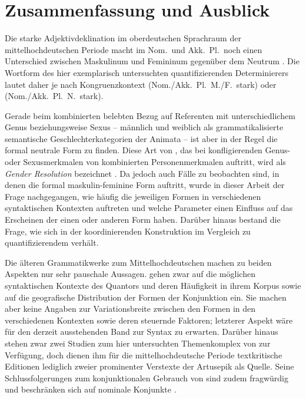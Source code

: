 \chapter{Zusammenfassung und Ausblick}
\label{ch:zusammenfassung}

Die starke Adjektivdeklination im oberdeutschen Sprachraum der
mittelhochdeutschen Periode macht im Nom.\ und Akk.\ Pl.\ noch einen
Unterschied zwischen Maskulinum und Femininum gegenüber dem Neutrum
\autocite[182]{ksw2}. Die Wortform des hier exemplarisch untersuchten
quantifizierenden Determinierers  lautet daher je nach
Kongruenzkontext  (Nom./Akk.\ Pl.\ M./F.\ stark) oder 
(Nom./Akk.\ Pl.\ N.\ stark).

Gerade beim kombinierten belebten Bezug auf Referenten mit unterschiedlichem
Genus beziehungsweise Sexus -- männlich und weiblich als grammatikalisierte
semantische Geschlechterkategorien der Animata -- ist aber in der Regel die
formal neutrale Form zu finden. Diese Art von , das bei
konfligierenden Genus- oder Sexusmerkmalen von kombinierten Personenmerkmalen
auftritt, wird als \textit{Gender Resolution} bezeichnet
\autocites{corbett1983}[264--306]{corbett1991}. Da jedoch auch Fälle zu
beobachten sind, in denen die formal maskulin-feminine Form auftritt, wurde in
dieser Arbeit der Frage nachgegangen, wie häufig die jeweiligen Formen in
verschiedenen syntaktischen Kontexten auftreten und welche Parameter einen
Einfluss auf das Erscheinen der einen oder anderen Form haben. Darüber hinaus
bestand die Frage, wie sich  in der koordinierenden
Konstruktion   im
Vergleich zu quantifizierendem  verhält.

Die älteren Grammatikwerke zum Mittelhochdeutschen
\autocites[384]{paul2007}[187--189, 222]{dal2014}[258]{michels1979}%
[221]{mettke2000} machen zu beiden Aspekten nur sehr pauschale Aussagen.
\citet[621--628]{ksw2} gehen zwar auf die möglichen syntaktischen Kontexte des
Quantors  und deren Häufigkeit in ihrem Korpus sowie auf die
geografische Distribution der Formen der Konjunktion  ein. Sie
machen aber keine Angaben zur Variationsbreite zwischen den Formen in den
verschiedenen Kontexten sowie deren steuernde Faktoren; letzterer Aspekt wäre
für den derzeit ausstehenden Band zur Syntax zu erwarten. Darüber hinaus stehen
zwar zwei Studien zum hier untersuchten Themenkomplex von
\citet{askedal1973,askedal1974} zur Verfügung, doch dienen ihm für die
mittelhochdeutsche Periode textkritische Editionen lediglich zweier
prominenter Verstexte der Artusepik als Quelle. Seine Schlussfolgerungen zum
konjunktionalen Gebrauch von  \autocite{askedal1974} sind zudem
fragwürdig und beschränken sich auf nominale Konjunkte \autocite{gjelsten1980}.

